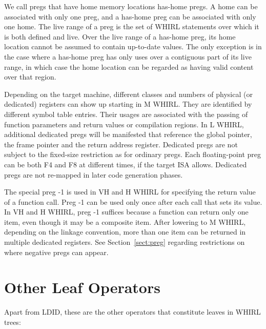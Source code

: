 \begin{itemize}
We call pregs
that have home memory locations has-home pregs. A home can be
associated with only one preg, and a has-home preg can be associated
with only one home. The live range of a preg is the set of
WHIRL statements over which it is both defined and live. Over the
live range of a has-home preg, its home location cannot be assumed
to contain up-to-date values. The only exception is in the case
where a has-home preg has only uses over a contiguous part of its live
range, in which case the home location can be regarded as having valid
content over that region. 

Depending on the target machine, different classes and numbers of
physical (or dedicated) registers can show up starting in M WHIRL.
They are identified by different symbol table entries. Their usages
are associated with the passing of function parameters and return
values or compilation regions. In L WHIRL, additional dedicated
pregs will be manifested that reference the global pointer, the
frame pointer and the return address register. Dedicated pregs are
not subject to the fixed-size restriction as for ordinary pregs.
Each floating-point preg can be both F4 and F8 at different times,
if the target ISA allows. Dedicated pregs are not re-mapped in
later code generation phases.

The special preg -1 is used in VH and H WHIRL for specifying the
return value of a function call. Preg -1 can be used only once after
each call that sets its value. In VH and H WHIRL, preg -1 suffices
because a function can return only one item, even though it may be
a composite item. After lowering to M WHIRL, depending on the
linkage convention, more than one item can be returned in multiple
dedicated registers. See Section~\ref{sect:preg}
regarding restrictions on
where negative pregs can appear.

\end{itemize}

\section{Other Leaf Operators}

Apart from
%
LDID, these are the other operators that constitute
leaves in WHIRL trees:

